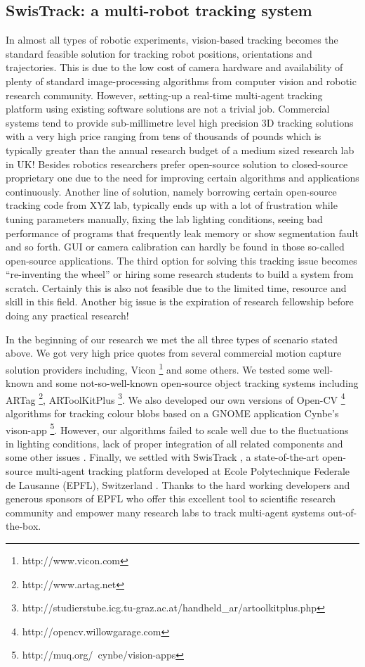 \subsection{SwisTrack: a multi-robot tracking system}
\label{expt-tools:mrts}
In almost all types of robotic experiments, vision-based tracking becomes the standard feasible solution for tracking robot positions, orientations and trajectories. This is due to the low cost of camera hardware and availability of plenty of standard image-processing algorithms from computer vision and robotic research community. However,  setting-up a real-time multi-agent tracking platform using existing software solutions are not a trivial job. Commercial systems tend to provide sub-millimetre level high precision 3D tracking solutions with a very high price ranging from tens of thousands of pounds which is typically greater than the annual research budget of a medium sized research lab in UK! Besides robotics researchers prefer open-source solution to closed-source proprietary one due to the need  for improving certain algorithms and applications continuously. Another line of solution, namely borrowing certain open-source tracking code from XYZ lab, typically ends up with a lot of frustration while tuning parameters manually, fixing the lab lighting conditions, seeing bad performance of programs that frequently leak  memory or show segmentation fault and so forth. GUI or camera calibration can hardly be found in those so-called open-source applications. The third option for solving this tracking issue becomes ``re-inventing the wheel'' or hiring some research students to build a system from scratch. Certainly this is also not feasible due to the limited time, resource and skill in this field. Another big issue is the expiration of research fellowship before doing any practical research!

In the beginning of our research we met the all three types of scenario stated above. We got very high price quotes from several commercial motion capture solution providers including,  Vicon \footnote{http://www.vicon.com} and some others. We tested some well-known and some not-so-well-known open-source object tracking systems including ARTag \footnote{http://www.artag.net}, ARToolKitPlus \footnote{http://studierstube.icg.tu-graz.ac.at/handheld\_ar/artoolkitplus.php}. We also developed our own versions of Open-CV \footnote{http://opencv.willowgarage.com}  algorithms for tracking colour blobs based on a GNOME application Cynbe's vison-app \footnote{http://muq.org/~cynbe/vision-apps}. However, our algorithms failed to scale well due to the fluctuations in lighting conditions, lack of proper integration of all related components  and some other issues \cite{Sarker2008}. Finally, we settled with SwisTrack \cite{Lochmatter+2008} , a state-of-the-art open-source  multi-agent tracking platform developed at  Ecole Polytechnique Federale de Lausanne (EPFL), Switzerland . Thanks to the hard working developers and generous sponsors of EPFL who offer this excellent tool to scientific research community and empower many research labs to track multi-agent systems out-of-the-box.

